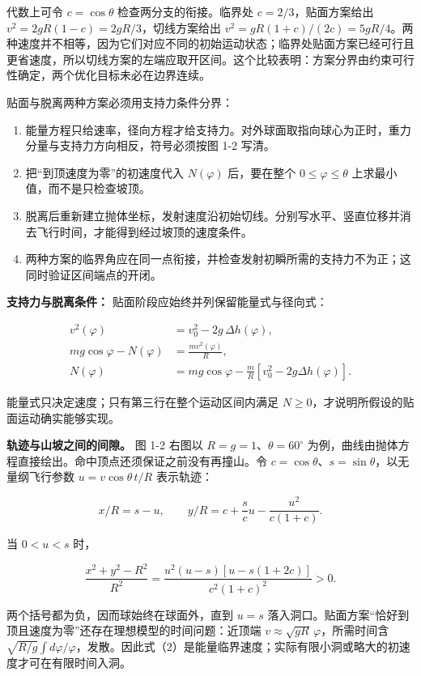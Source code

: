 \documentclass[12pt,a4paper,UTF8]{ctexart}
\newcommand{\tightlist}{\setlength{\itemsep}{0pt}\setlength{\parskip}{0pt}}
\begin{document}
代数上可令 \(c=\cos\theta\) 检查两分支的衔接。临界处
\(c=2/3\)，贴面方案给出 \(v^2=2gR(1-c)=2gR/3\)，切线方案给出
\(v^2=gR(1+c)/(2c)=5gR/4\)。两种速度并不相等，因为它们对应不同的初始运动状态；临界处贴面方案已经可行且更省速度，所以切线方案的左端应取开区间。这个比较表明：方案分界由约束可行性确定，两个优化目标未必在边界连续。

贴面与脱离两种方案必须用支持力条件分界：

\begin{enumerate}
\def\labelenumi{\arabic{enumi}.}
\tightlist
\item
  能量方程只给速率，径向方程才给支持力。对外球面取指向球心为正时，重力分量与支持力方向相反，符号必须按图
  1-2 写清。
\item
  把``到顶速度为零''的初速度代入 \(N(\varphi)\) 后，要在整个
  \(0\le\varphi\le\theta\) 上求最小值，而不是只检查坡顶。
\item
  脱离后重新建立抛体坐标，发射速度沿初始切线。分别写水平、竖直位移并消去飞行时间，才能得到经过坡顶的速度条件。
\item
  两种方案的临界角应在同一点衔接，并检查发射初瞬所需的支持力不为正；这同时验证区间端点的开闭。
\end{enumerate}

\textbf{支持力与脱离条件：} 贴面阶段应始终并列保留能量式与径向式：

\[\begin{aligned}
v^2(\varphi)&=v_0^2-2g\,\Delta h(\varphi),\\
mg\cos\varphi-N(\varphi)&=\frac{mv^2(\varphi)}{R},\\
N(\varphi)&=mg\cos\varphi-\frac{m}{R}
\left[v_0^2-2g\Delta h(\varphi)\right].
\end{aligned}\]

能量式只决定速度；只有第三行在整个运动区间内满足
\(N\ge0\)，才说明所假设的贴面运动确实能够实现。

\textbf{轨迹与山坡之间的间隙。} 图 1-2 右图以
\(R=g=1\)、\(\theta=60^\circ\)
为例，曲线由抛体方程直接绘出。命中顶点还须保证之前没有再撞山。令
\(c=\cos\theta\)、\(s=\sin\theta\)，以无量纲飞行参数
\(u=v\cos\theta\,t/R\) 表示轨迹：

\[x/R=s-u,\qquad y/R=c+\frac{s}{c}u-\frac{u^2}{c(1+c)}.\]

当 \(0<u<s\) 时，

\[\frac{x^2+y^2-R^2}{R^2}=\frac{u^2(u-s)[u-s(1+2c)]}{c^2(1+c)^2}>0.\]

两个括号都为负，因而球始终在球面外，直到 \(u=s\)
落入洞口。贴面方案``恰好到顶且速度为零''还存在理想模型的时间问题：近顶端
\(v\approx\sqrt{gR}\,\varphi\)，所需时间含
\(\sqrt{R/g}\int d\varphi/\varphi\)，发散。因此式（2）是能量临界速度；实际有限小洞或略大的初速度才可在有限时间入洞。
\end{document}
